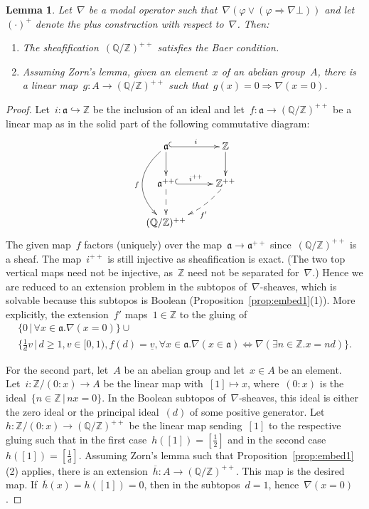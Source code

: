 \documentclass[oneside]{amsart}
\theoremstyle{definition}
\theoremstyle{plain}
\newtheorem{lemma}[defn]{Lemma}
\theoremstyle{remark}
\newcommand{\aaa}{\mathfrak{a}}
\newcommand{\ZZ}{\mathbb{Z}}
\newcommand{\QQ}{\mathbb{Q}}
\renewcommand{\_}{\mathpunct{.}\,}
\begin{document}
\begin{lemma}\label{lemma:q-mod-z}
Let~$\nabla$ be a modal operator such
that~$\nabla(\varphi \vee (\varphi \Rightarrow \nabla\bot))$ and
let~$(\cdot)^+$ denote the plus construction with respect to~$\nabla$. Then:
\begin{enumerate}
\item The sheafification~$(\QQ/\ZZ)^{++}$ satisfies the Baer condition.
\item Assuming Zorn's lemma, given an element~$x$ of an abelian group~$A$,
there is a linear map~$g : A \to (\QQ/\ZZ)^{++}$ such that~$g(x) = 0
\Rightarrow \nabla(x=0)$.
\end{enumerate}
\end{lemma}

\begin{proof}Let~$i : \aaa \hookrightarrow \ZZ$ be the inclusion of an ideal
and let~$f : \aaa \to (\QQ/\ZZ)^{++}$ be a linear map as in the solid part of the following
commutative diagram:
\[ \xymatrix{
  \aaa \ar@{^{(}->}[r]^i\ar[d]\ar@/_2pc/[dd]_f & \ZZ \ar[d] \\
  \aaa^{++} \ar@{^{(}->}[r]^{i^{++}}\ar@{-->}[d] & \ZZ^{++}\ar@{-->}@/^/[ld]^{f'} \\
  (\QQ/\ZZ)^{++}
} \]
The given map~$f$ factors (uniquely) over the map~$\aaa \to \aaa^{++}$
since~$(\QQ/\ZZ)^{++}$ is a sheaf. The map~$i^{++}$ is still injective as
sheafification is exact. (The two top vertical maps need not be injective,
as~$\ZZ$ need not be separated for~$\nabla$.) Hence we are reduced to an
extension problem in the subtopos of~$\nabla$-sheaves, which is solvable
because this subtopos is Boolean (Proposition~\ref{prop:embed1}(1)). More
explicitly, the extension~$f'$ maps~$1 \in \ZZ$ to the gluing of
\begin{multline*}
  \{ 0 \,|\, \forall x \in \aaa. \nabla(x = 0) \} \cup {}\\
  \{ \tfrac{1}{d} v \,|\, d \geq 1, v \in [0,1),
    f(d) = \underline{v}, \forall x \in \aaa. \nabla(x \in \aaa)
    \Leftrightarrow \nabla(\exists n \in \ZZ. x = nd) \}.
\end{multline*}

For the second part, let~$A$ be an abelian group and let~$x \in A$ be an
element. Let~$i : \ZZ/(0:x) \to A$ be the linear map with~$[1] \mapsto x$,
where~$(0:x)$ is the ideal~$\{ n \in \ZZ \,|\, nx = 0 \}$. In the Boolean
subtopos of~$\nabla$-sheaves, this ideal is either the zero ideal or the
principal ideal~$(d)$ of some positive generator. Let~$h : \ZZ/(0:x) \to
(\QQ/\ZZ)^{++}$ be the linear map sending~$[1]$ to the respective gluing such
that in the first case~$h([1]) = [\tfrac{1}{2}]$ and in the second case~$h([1])
= [\frac{1}{d}]$. Assuming Zorn's lemma such that
Proposition~\ref{prop:embed1}(2) applies, there is an extension~$\overline{h} :
A \to (\QQ/\ZZ)^{++}$. This map is the desired map. If~$\overline{h}(x) =
h([1]) = 0$, then in the subtopos~$d = 1$, hence~$\nabla(x = 0)$.
\end{proof}
\end{document}
